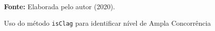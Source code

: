 \begin{figure}[ht!]
\centering

\caption{\textmd{Uso do método \texttt{isClag} para identificar nível de Ampla Concorrência}}
\label{fig:behaviorcatuso}

\par\medskip\textbf{Fonte:} Elaborada pelo autor (2020). \par\medskip

\end{figure}

